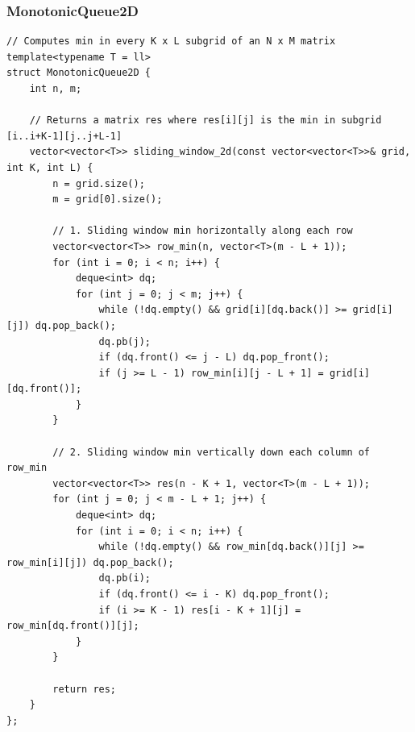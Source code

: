 \documentclass[9pt,a4paper,twocolumn]{extarticle}
\begin{document}
\subsubsection{MonotonicQueue2D}
\nopagebreak
\begin{lstlisting}
// Computes min in every K x L subgrid of an N x M matrix
template<typename T = ll>
struct MonotonicQueue2D {
    int n, m;

    // Returns a matrix res where res[i][j] is the min in subgrid [i..i+K-1][j..j+L-1]
    vector<vector<T>> sliding_window_2d(const vector<vector<T>>& grid, int K, int L) {
        n = grid.size();
        m = grid[0].size();

        // 1. Sliding window min horizontally along each row
        vector<vector<T>> row_min(n, vector<T>(m - L + 1));
        for (int i = 0; i < n; i++) {
            deque<int> dq;
            for (int j = 0; j < m; j++) {
                while (!dq.empty() && grid[i][dq.back()] >= grid[i][j]) dq.pop_back();
                dq.pb(j);
                if (dq.front() <= j - L) dq.pop_front();
                if (j >= L - 1) row_min[i][j - L + 1] = grid[i][dq.front()];
            }
        }

        // 2. Sliding window min vertically down each column of row_min
        vector<vector<T>> res(n - K + 1, vector<T>(m - L + 1));
        for (int j = 0; j < m - L + 1; j++) {
            deque<int> dq;
            for (int i = 0; i < n; i++) {
                while (!dq.empty() && row_min[dq.back()][j] >= row_min[i][j]) dq.pop_back();
                dq.pb(i);
                if (dq.front() <= i - K) dq.pop_front();
                if (i >= K - 1) res[i - K + 1][j] = row_min[dq.front()][j];
            }
        }

        return res;
    }
};
\end{lstlisting}

\filbreak
\end{document}
